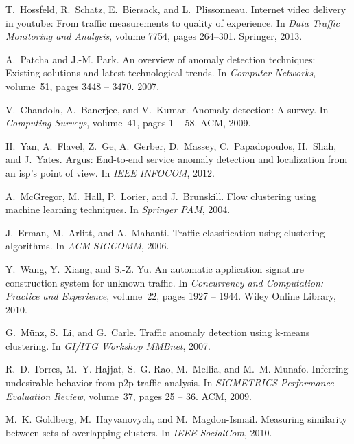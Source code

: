 \documentclass{acm_proc_article-sp}
\begin{document}
\begin{thebibliography}{10}
T.~Hossfeld, R.~Schatz, E.~Biersack, and L.~Plissonneau.
\newblock Internet video delivery in youtube: From traffic measurements to
  quality of experience.
\newblock In {\em Data Traffic Monitoring and Analysis}, volume 7754, pages
  264--301. Springer, 2013.

A.~Patcha and J.-M. Park.
\newblock An overview of anomaly detection techniques: Existing solutions and
  latest technological trends.
\newblock In {\em Computer Networks}, volume~51, pages 3448 -- 3470. 2007.

V.~Chandola, A.~Banerjee, and V.~Kumar.
\newblock Anomaly detection: A survey.
\newblock In {\em Computing Surveys}, volume~41, pages 1 -- 58. ACM, 2009.

H.~Yan, A.~Flavel, Z.~Ge, A.~Gerber, D.~Massey, C.~Papadopoulos, H.~Shah, and
  J.~Yates.
\newblock Argus: End-to-end service anomaly detection and localization from an
  isp's point of view.
\newblock In {\em IEEE INFOCOM}, 2012.

A.~McGregor, M.~Hall, P.~Lorier, and J.~Brunskill.
\newblock Flow clustering using machine learning techniques.
\newblock In {\em Springer PAM}, 2004.

J.~Erman, M.~Arlitt, and A.~Mahanti.
\newblock Traffic classification using clustering algorithms.
\newblock In {\em ACM SIGCOMM}, 2006.

Y.~Wang, Y.~Xiang, and S.-Z. Yu.
\newblock An automatic application signature construction system for unknown
  traffic.
\newblock In {\em Concurrency and Computation: Practice and Experience},
  volume~22, pages 1927 -- 1944. Wiley Online Library, 2010.

G.~M{\"u}nz, S.~Li, and G.~Carle.
\newblock Traffic anomaly detection using k-means clustering.
\newblock In {\em GI/ITG Workshop MMBnet}, 2007.

R.~D. Torres, M.~Y. Hajjat, S.~G. Rao, M.~Mellia, and M.~M. Munafo.
\newblock Inferring undesirable behavior from p2p traffic analysis.
\newblock In {\em SIGMETRICS Performance Evaluation Review}, volume~37, pages
  25 -- 36. ACM, 2009.

M.~K. Goldberg, M.~Hayvanovych, and M.~Magdon-Ismail.
\newblock Measuring similarity between sets of overlapping clusters.
\newblock In {\em IEEE SocialCom}, 2010.


\end{thebibliography}
\end{document}
